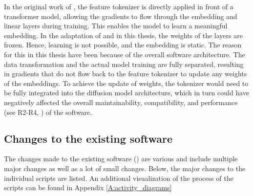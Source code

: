 In the original work of \cite{gorishniy2021RevisitingDeepLearning}, the feature tokenizer is directly applied in front of a transformer model, allowing the gradients to flow through the embedding and linear layers during training.
This enables the model to learn a meaningful embedding.
In the adaptation of \cite{zheng2023DiffusionModelsMissing} and in this thesis, the weights of the layers are frozen.
Hence, learning is not possible, and the embedding is static.
The reason for this in this thesis have been because of the overall software architecture.
The data transformation and the actual model training are fully separated,
resulting in gradients that do not flow back to the feature tokenizer to update any weights of the embeddings.
To achieve the update of weights, the tokenizer would need to be fully integrated into the diffusion model architecture, which in turn could have negatively affected the overall maintainability, compatibility, and performance (see R2-R4, ) of the software.

\subsection{Changes to the existing software}
\label{ch:methods-changes}
The changes made to the existing software () are various and include multiple major changes as well as a lot of small changes.
Below, the major changes to the individual scripts are listed.
An additional visualization of the process of the scripts can be found in Appendix \ref{A:activity_diagrams}

